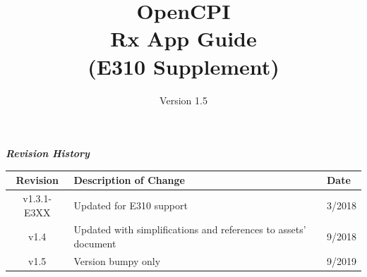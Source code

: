 \def\docTitle{OpenCPI\\ Rx App Guide\\ (E310 Supplement)}
\def\docVersion{1.5}
\def\snippetpath{../../../../../../doc/av/tex/snippets}


\date{Version \docVersion} %
\title{\docTitle}
\usepackage{graphicx}
\graphicspath{ {figures/} }
\usepackage{textcomp}


\maketitle
\newpage
	\begin{center}
	\textit{\textbf{Revision History}}
		\begin{table}[H]
		\label{table:revisions} %
			\begin{tabularx}{\textwidth}{|c|X|l|}
			\hline
			\rowcolor{blue}
			\textbf{Revision} & \textbf{Description of Change} & \textbf{Date} \\
			\hline
			v1.3.1-E3XX & Updated for E310 support & 3/2018 \\
			\hline
			v1.4 & Updated with simplifications and references to assets' document & 9/2018 \\
			\hline
			v1.5 & Version bumpy only & 9/2019 \\
			\hline
			\end{tabularx}
		\end{table}
	\end{center}

